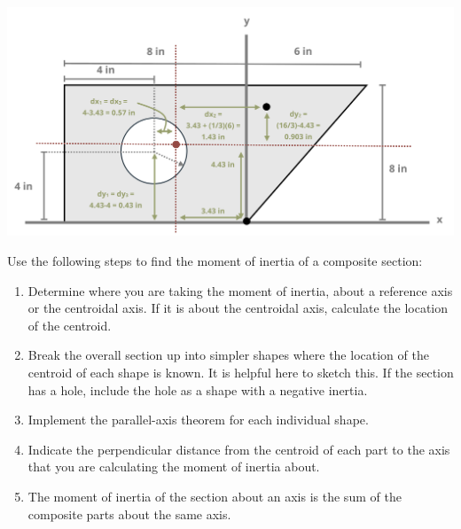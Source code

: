 \documentclass[
  letterpaper,
  DIV=11,
  numbers=noendperiod]{scrreprt}
\providecommand{\tightlist}{%
  \setlength{\itemsep}{0pt}\setlength{\parskip}{0pt}}\usepackage{longtable,booktabs,array}
\theoremstyle{definition}
\theoremstyle{remark}
\begin{document}
\begin{tcolorbox}
\begin{tcolorbox}
\begin{center}
\includegraphics{images/CH 8 PNGs/example 8.6 part 4.png}
\end{center}

\end{tcolorbox}

\end{tcolorbox}

\begin{tcolorbox}[enhanced jigsaw, leftrule=.75mm, colbacktitle=quarto-callout-warning-color!10!white, breakable, opacityback=0, colback=white, titlerule=0mm, toprule=.15mm, colframe=quarto-callout-warning-color-frame, coltitle=black, title={Step-by-step: Finding the Moment of Inertia}, toptitle=1mm, bottomrule=.15mm, rightrule=.15mm, left=2mm, arc=.35mm, opacitybacktitle=0.6, bottomtitle=1mm]

Use the following steps to find the moment of inertia of a composite
section:

\begin{enumerate}
\def\labelenumi{\arabic{enumi}.}
\tightlist
\item
  Determine where you are taking the moment of inertia, about a
  reference axis or the centroidal axis. If it is about the centroidal
  axis, calculate the location of the centroid.
\item
  Break the overall section up into simpler shapes where the location of
  the centroid of each shape is known. It is helpful here to sketch
  this. If the section has a hole, include the hole as a shape with a
  negative inertia.
\item
  Implement the parallel-axis theorem for each individual shape.
\item
  Indicate the perpendicular distance from the centroid of each part to
  the axis that you are calculating the moment of inertia about.
\item
  The moment of inertia of the section about an axis is the sum of the
  composite parts about the same axis.
\end{enumerate}

\end{tcolorbox}
\end{document}
